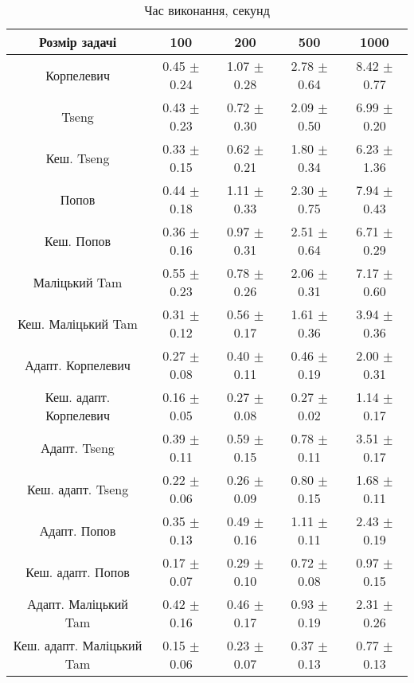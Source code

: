 \begin{table}[H]
	\centering
	\begin{tabular}{|c||c|c|c|c|}\hline
		Розмір задачі & 100 & 200 & 500 & 1000 \\ \hline \hline
		Корпелевич & 0.45 $\pm$ 0.24 & 1.07 $\pm$ 0.28 & 2.78 $\pm$ 0.64 & 8.42 $\pm$ 0.77 \\ \hline
		Tseng & 0.43 $\pm$ 0.23 & 0.72 $\pm$ 0.30 & 2.09 $\pm$ 0.50 & 6.99 $\pm$ 0.20 \\ \hline
		Кеш. Tseng & 0.33 $\pm$ 0.15 & 0.62 $\pm$ 0.21 & 1.80 $\pm$ 0.34 & 6.23 $\pm$ 1.36 \\ \hline
		Попов & 0.44 $\pm$ 0.18 & 1.11 $\pm$ 0.33 & 2.30 $\pm$ 0.75 & 7.94 $\pm$ 0.43 \\ \hline
		Кеш. Попов & 0.36 $\pm$ 0.16 & 0.97 $\pm$ 0.31 & 2.51 $\pm$ 0.64 & 6.71 $\pm$ 0.29 \\ \hline
		Маліцький Tam & 0.55 $\pm$ 0.23 & 0.78 $\pm$ 0.26 & 2.06 $\pm$ 0.31 & 7.17 $\pm$ 0.60 \\ \hline
		Кеш. Маліцький Tam & 0.31 $\pm$ 0.12 & 0.56 $\pm$ 0.17 & 1.61 $\pm$ 0.36 & 3.94 $\pm$ 0.36 \\ \hline \hline
		Адапт. Корпелевич & 0.27 $\pm$ 0.08 & 0.40 $\pm$ 0.11 & 0.46 $\pm$ 0.19 & 2.00 $\pm$ 0.31 \\ \hline
		Кеш. адапт. Корпелевич & 0.16 $\pm$ 0.05 & 0.27 $\pm$ 0.08 & 0.27 $\pm$ 0.02 & 1.14 $\pm$ 0.17 \\ \hline
		Адапт. Tseng & 0.39 $\pm$ 0.11 & 0.59 $\pm$ 0.15 & 0.78 $\pm$ 0.11 & 3.51 $\pm$ 0.17 \\ \hline
		Кеш. адапт. Tseng & 0.22 $\pm$ 0.06 & 0.26 $\pm$ 0.09 & 0.80 $\pm$ 0.15 & 1.68 $\pm$ 0.11 \\ \hline
		Адапт. Попов & 0.35 $\pm$ 0.13 & 0.49 $\pm$ 0.16 & 1.11 $\pm$ 0.11 & 2.43 $\pm$ 0.19 \\ \hline
		Кеш. адапт. Попов & 0.17 $\pm$ 0.07 & 0.29 $\pm$ 0.10 & 0.72 $\pm$ 0.08 & 0.97 $\pm$ 0.15 \\ \hline
		Адапт. Маліцький Tam & 0.42 $\pm$ 0.16 & 0.46 $\pm$ 0.17 & 0.93 $\pm$ 0.19 & 2.31 $\pm$ 0.26 \\ \hline
		Кеш. адапт. Маліцький Tam & 0.15 $\pm$ 0.06 & 0.23 $\pm$ 0.07 & 0.37 $\pm$ 0.13 & 0.77 $\pm$ 0.13 \\ \hline
	\end{tabular}
	\caption{Час виконання, секунд}
\end{table}

